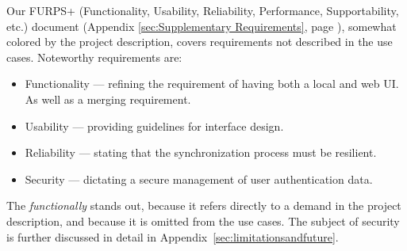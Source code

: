 Our FURPS+ (Functionality, Usability, Reliability, Performance, Supportability, etc.) document (Appendix \ref{sec:Supplementary Requirements}, page \pageref{sec:Supplementary Requirements}), somewhat colored by the project description, covers requirements not described in the use cases. 
Noteworthy requirements are: 
\begin{itemize}
\item Functionality --- refining the requirement of having both a local and web UI. As well as a merging requirement.
\item Usability --- providing guidelines for interface design.
\item Reliability --- stating that the synchronization process must be resilient.
\item Security --- dictating a secure management of user authentication data.
\end{itemize}
The \emph{functionally} stands out, because it refers directly to a demand in the project description, and because it is omitted from the use cases.
The subject of security is further discussed in detail in Appendix~\ref{sec:limitationsandfuture}.
